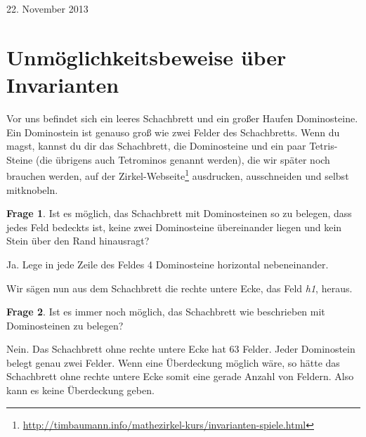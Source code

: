 \documentclass[a4paper,ngerman,12pt]{scrartcl}
\newcommand{\datum}[1]{\hfill {#1}\\}
\theoremstyle{definition}
\newtheorem*{frage}{Frage}
\begin{document}
\datum{22. November 2013}

\section{Unmöglichkeitsbeweise über Invarianten}

\begin{figure}
  \vspace{-24pt}
  \begin{center}
  \end{center}
  \vspace{-50pt}
\end{figure}

Vor uns befindet sich ein leeres Schachbrett und ein großer Haufen Dominosteine. Ein Dominostein ist genauso groß wie zwei Felder des Schachbretts. Wenn du magst, kannst du dir das Schachbrett, die Dominosteine und ein paar Tetris-Steine (die übrigens auch Tetrominos genannt werden), die wir später noch brauchen werden, auf der Zirkel-Webseite\footnote{\mbox{\url{http://timbaumann.info/mathezirkel-kurs/invarianten-spiele.html}}} ausdrucken, ausschneiden und selbst mitknobeln.

\begin{frage}
  Ist es möglich, das Schachbrett mit Dominosteinen so zu belegen, dass jedes Feld bedeckts ist, keine zwei Dominosteine übereinander liegen und kein Stein über den Rand hinausragt? 
\end{frage}

\begin{antw}
  Ja. Lege in jede Zeile des Feldes 4 Dominosteine horizontal nebeneinander.
\end{antw}

Wir sägen nun aus dem Schachbrett die rechte untere Ecke, das Feld \emph{h1}, heraus.

\begin{frage}
  Ist es immer noch möglich, das Schachbrett wie beschrieben mit Dominosteinen zu belegen?
\end{frage}

\begin{antw}
  Nein. Das Schachbrett ohne rechte untere Ecke hat 63 Felder. Jeder Dominostein belegt genau zwei Felder. Wenn eine Überdeckung möglich wäre, so hätte das Schachbrett ohne rechte untere Ecke somit eine gerade Anzahl von Feldern. Also kann es keine Überdeckung geben.
\end{antw}
\end{document}
